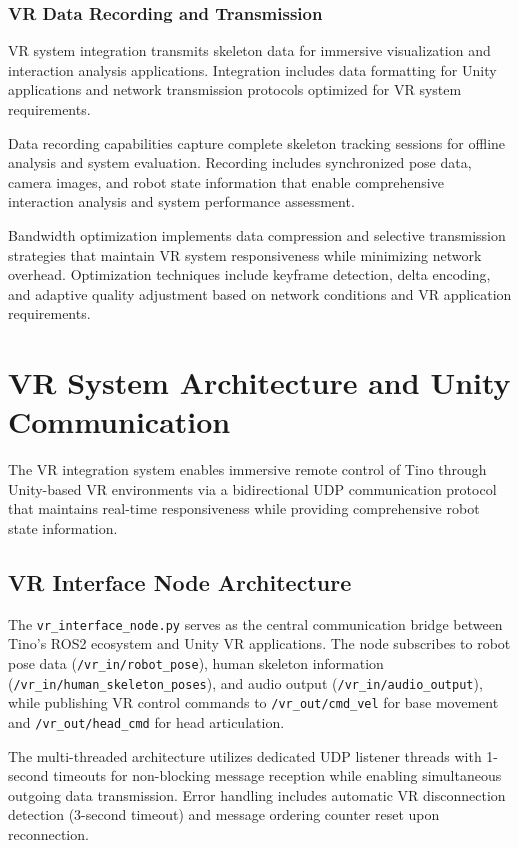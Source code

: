\subsubsection{VR Data Recording and Transmission}

VR system integration transmits skeleton data for immersive visualization and interaction analysis applications. Integration includes data formatting for Unity applications and network transmission protocols optimized for VR system requirements.

Data recording capabilities capture complete skeleton tracking sessions for offline analysis and system evaluation. Recording includes synchronized pose data, camera images, and robot state information that enable comprehensive interaction analysis and system performance assessment.

Bandwidth optimization implements data compression and selective transmission strategies that maintain VR system responsiveness while minimizing network overhead. Optimization techniques include keyframe detection, delta encoding, and adaptive quality adjustment based on network conditions and VR application requirements.


\section{VR System Architecture and Unity Communication}

The VR integration system enables immersive remote control of Tino through Unity-based VR environments via a bidirectional UDP communication protocol that maintains real-time responsiveness while providing comprehensive robot state information.

\subsection{VR Interface Node Architecture}

The \texttt{vr\_interface\_node.py} serves as the central communication bridge between Tino's ROS2 ecosystem and Unity VR applications. The node subscribes to robot pose data (\texttt{/vr\_in/robot\_pose}), human skeleton information (\texttt{/vr\_in/human\_skeleton\_poses}), and audio output (\texttt{/vr\_in/audio\_output}), while publishing VR control commands to \texttt{/vr\_out/cmd\_vel} for base movement and \texttt{/vr\_out/head\_cmd} for head articulation.

The multi-threaded architecture utilizes dedicated UDP listener threads with 1-second timeouts for non-blocking message reception while enabling simultaneous outgoing data transmission. Error handling includes automatic VR disconnection detection (3-second timeout) and message ordering counter reset upon reconnection.

